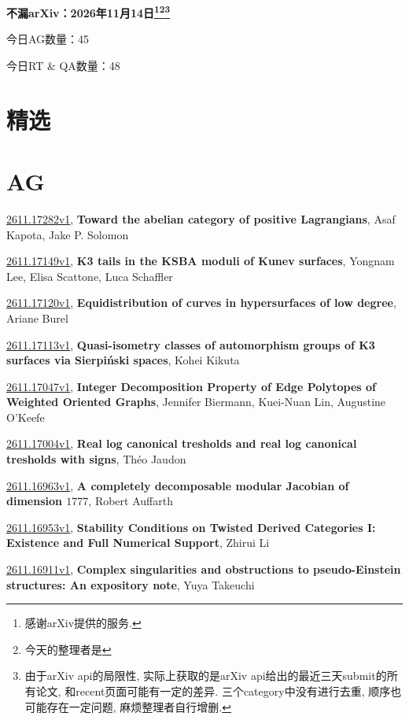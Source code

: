 \documentclass[9pt, a4paper]{article}
\theoremstyle{plain}
\theoremstyle{definition}
\theoremstyle{remark}
\newcommand{\arxiv}[3]{\href{https://arxiv.org/abs/#1}{#1}, \textbf{\textcolor{arxivblue}{#2}}, #3}
\newcommand{\AGnumber}{45}
\newcommand{\RTQAnumber}{48}
\newcommand{\NewestDate}{2026年11月14日}
\newcommand{\todayarXiver}{} %
\begin{document}
\begin{center}
    \Huge\textbf{不漏arXiv：\NewestDate\footnote{感谢arXiv提供的服务.}\footnote{今天的整理者是\todayarXiver}\footnote{由于arXiv api的局限性, 实际上获取的是arXiv api给出的最近三天submit的所有论文, 和recent页面可能有一定的差异. 三个category中没有进行去重, 顺序也可能存在一定问题, 麻烦整理者自行增删.}} \\
\end{center}

\setcounter{section}{-1}

\begin{center}
    今日AG数量：\AGnumber
    
    今日RT \& QA数量：\RTQAnumber
    
\end{center}


\section{精选}


\section{AG}
\arxiv{2611.17282v1}{Toward the abelian category of positive Lagrangians}{Asaf Kapota, Jake P. Solomon}

\arxiv{2611.17149v1}{K3 tails in the KSBA moduli of Kunev surfaces}{Yongnam Lee, Elisa Scattone, Luca Schaffler}

\arxiv{2611.17120v1}{Equidistribution of curves in hypersurfaces of low degree}{Ariane Burel}

\arxiv{2611.17113v1}{Quasi-isometry classes of automorphism groups of K3 surfaces via Sierpiński spaces}{Kohei Kikuta}

\arxiv{2611.17047v1}{Integer Decomposition Property of Edge Polytopes of Weighted Oriented Graphs}{Jennifer Biermann, Kuei-Nuan Lin, Augustine O'Keefe}

\arxiv{2611.17004v1}{Real log canonical tresholds and real log canonical tresholds with signs}{Th{é}o Jaudon}

\arxiv{2611.16963v1}{A completely decomposable modular Jacobian of dimension $1777$}{Robert Auffarth}

\arxiv{2611.16953v1}{Stability Conditions on Twisted Derived Categories I: Existence and Full Numerical Support}{Zhirui Li}

\arxiv{2611.16911v1}{Complex singularities and obstructions to pseudo-Einstein structures: An expository note}{Yuya Takeuchi}
\end{document}
